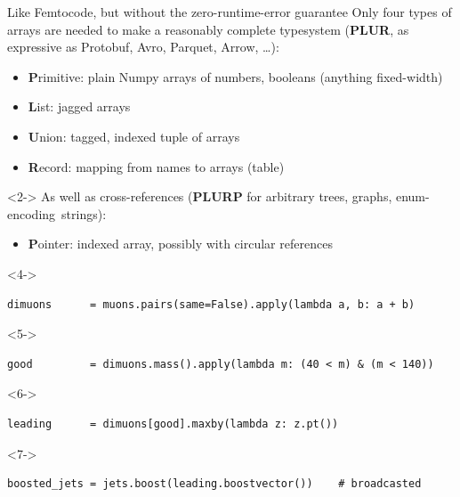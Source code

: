 \documentclass[aspectratio=169]{beamer}
\begin{document}
\begin{frame}[fragile]{Like Femtocode, but without the zero-runtime-error guarantee}
\vspace{0.25 cm}
Only four types of arrays are needed to make a reasonably complete typesystem ({\bf PLUR}, as expressive as Protobuf, Avro, Parquet, Arrow, \ldots):
\begin{itemize}
\item {\bf P}rimitive: plain Numpy arrays of numbers, booleans (anything fixed-width)
\item {\bf L}ist: jagged arrays
\item {\bf U}nion: tagged, indexed tuple of arrays
\item {\bf R}ecord: mapping from names to arrays (table)
\end{itemize}

\vspace{0.25 cm}
\begin{uncoverenv}<2->
As well as cross-references ({\bf PLURP} for arbitrary trees, graphs, \mbox{enum-encoding strings):\hspace{-0.5 cm}}
\begin{itemize}
\item {\bf P}ointer: indexed array, possibly with circular references
\end{itemize}
\end{uncoverenv}

\vspace{0.25 cm}


\small
\begin{uncoverenv}<4->
\begin{verbatim}
dimuons      = muons.pairs(same=False).apply(lambda a, b: a + b)
\end{verbatim}
\end{uncoverenv}
\vspace{-0.35 cm}
\begin{uncoverenv}<5->
\begin{verbatim}
good         = dimuons.mass().apply(lambda m: (40 < m) & (m < 140))
\end{verbatim}
\end{uncoverenv}
\vspace{-0.35 cm}
\begin{uncoverenv}<6->
\begin{verbatim}
leading      = dimuons[good].maxby(lambda z: z.pt())
\end{verbatim}
\end{uncoverenv}
\vspace{-0.35 cm}
\begin{uncoverenv}<7->
\begin{verbatim}
boosted_jets = jets.boost(leading.boostvector())    # broadcasted
\end{verbatim}
\end{uncoverenv}
\end{frame}
\end{document}
